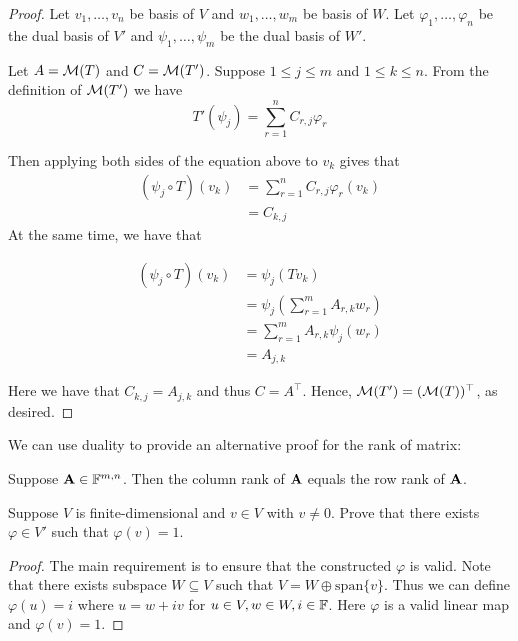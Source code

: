 \documentclass{extarticle}
\begin{document}
\begin{proof}
Let \(v_1, \ldots, v_n\) be basis of \(V\) and \(w_1, \ldots, w_m\) be basis of \(W\). Let 
\(\varphi_1, \ldots, \varphi_n\) be the dual basis of \(V'\) and \(\psi_1, \ldots, \psi_m\) 
be the dual basis of \(W'\). 

Let \(A = \mathcal{M}(T)\) and \(C = \mathcal{M}(T')\). Suppose \(1 \leq j \leq m\) and \(1 \leq k \leq n\). From 
the definition of \(\mathcal{M}(T')\) we have 
\[T'(\psi_j) = \sum_{r=1}^{n} C_{r, j} \varphi_r\]

Then applying both sides of the equation above to \(v_k\) gives that 
\begin{align*}
    (\psi_j \circ T) (v_k) 
    & = \sum_{r=1}^{n} C_{r, j} \varphi_r (v_k) \\ 
    & = C_{k, j}
\end{align*}
At the same time, we have that 

\begin{align*}
    (\psi_j \circ T) (v_k)
    &= \psi_j (T v_k) \\ 
    &= \psi_j \left(\sum_{r=1}^{m}A_{r, k} w_r \right) \\ 
    &= \sum_{r=1}^{m} A_{r, k} \psi_j (w_r) \\ 
    &= A_{j, k}
\end{align*}

Here we have that \(C_{k, j} = A_{j, k}\) and thus \(C = A^\top\). Hence, \(\mathcal{M}(T') = (\mathcal{M}(T))^\top\), 
as desired. 
\end{proof}

We can use duality to provide an alternative proof for the rank of matrix:

\begin{thm}
    Suppose \(\mathbf{A} \in \mathbb{F}^{m, n}\). Then the column rank of \(\mathbf{A}\) equals the row 
    rank of \(\mathbf{A}\). 
\end{thm}

\newpage 
{}
\begin{problem}{3}
    Suppose \(V\) is finite-dimensional and \(v \in V\) with \(v \neq 0\). Prove that 
    there exists \(\varphi \in V'\) such that \(\varphi(v) = 1\). 
\end{problem}

\begin{proof}
The main requirement is to ensure that the constructed \(\varphi\) is valid. Note that 
there exists  subspace \(W \subseteq V\) such that \(V = W \oplus \text{span}\{v\}\). Thus 
we can define \(\varphi(u) = i\) where \(u = w + iv\) for \(u \in V, w \in W, i \in \mathbb{F}\). Here 
\(\varphi\) is a valid linear map and \(\varphi(v) = 1\). 
\end{proof}
\end{document}
